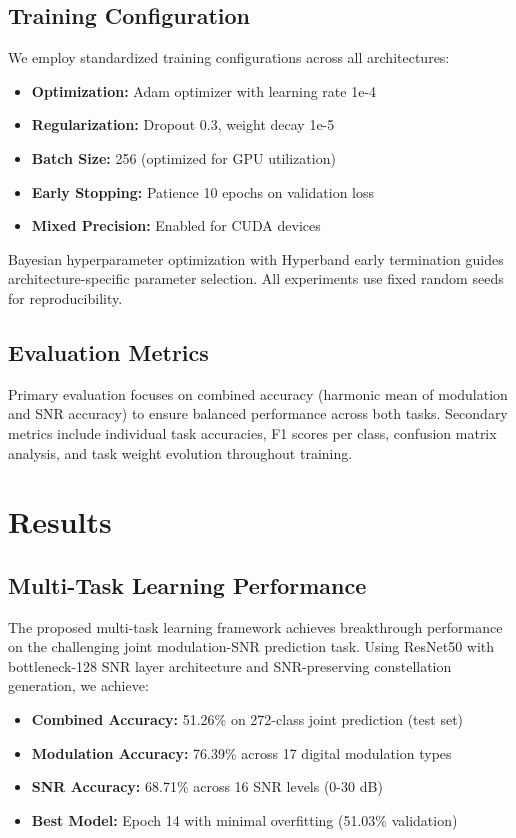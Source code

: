 \documentclass{ELSP}
\begin{document}
{{\subsection{Training Configuration}

We employ standardized training configurations across all architectures:
\begin{itemize}
    \item \textbf{Optimization:} Adam optimizer with learning rate 1e-4
    \item \textbf{Regularization:} Dropout 0.3, weight decay 1e-5
    \item \textbf{Batch Size:} 256 (optimized for GPU utilization)
    \item \textbf{Early Stopping:} Patience 10 epochs on validation loss
    \item \textbf{Mixed Precision:} Enabled for CUDA devices
\end{itemize}

Bayesian hyperparameter optimization with Hyperband early termination guides architecture-specific parameter selection. All experiments use fixed random seeds for reproducibility.

\subsection{Evaluation Metrics}

Primary evaluation focuses on combined accuracy (harmonic mean of modulation and SNR accuracy) to ensure balanced performance across both tasks. Secondary metrics include individual task accuracies, F1 scores per class, confusion matrix analysis, and task weight evolution throughout training.

\section{Results}

\subsection{Multi-Task Learning Performance}

The proposed multi-task learning framework achieves breakthrough performance on the challenging joint modulation-SNR prediction task. Using ResNet50 with bottleneck-128 SNR layer architecture and SNR-preserving constellation generation, we achieve:

\begin{itemize}
    \item \textbf{Combined Accuracy:} 51.26\% on 272-class joint prediction (test set)
    \item \textbf{Modulation Accuracy:} 76.39\% across 17 digital modulation types  
    \item \textbf{SNR Accuracy:} 68.71\% across 16 SNR levels (0-30 dB)
    \item \textbf{Best Model:} Epoch 14 with minimal overfitting (51.03\% validation)
\end{itemize}

}}
\end{document}
